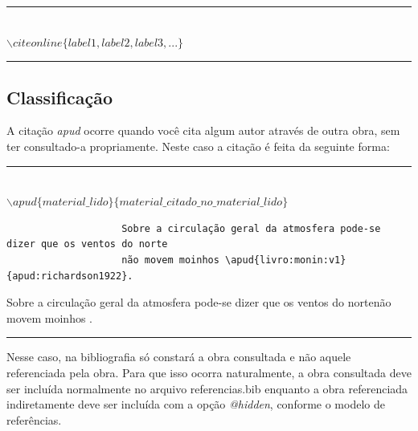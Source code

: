 \documentclass[oneside,openright,12pt]{ufsm_2015} %
\begin{document}
            \begin{center}\rule{0.5\textwidth}{1pt}\\$\backslash citeonline\{label1,label2,label3,...\}$\end{center}
            
            \begin{center}\rule{0.5\textwidth}{1pt}\end{center}   
            
            \subsection{Classificação}
                \par A citação \textit{apud} ocorre quando você cita algum autor através de outra obra, sem ter consultado-a propriamente. Neste caso a citação é feita da seguinte forma:
                \begin{center}
                  \rule{0.5\textwidth}{1pt}\\
                  $\backslash apud\{material\_lido\}\{material\_citado\_no\_material\_lido\}$ \\
                \end{center}
                \begin{verbatim}
                    Sobre a circulação geral da atmosfera pode-se dizer que os ventos do norte
                    não movem moinhos \apud{livro:monin:v1}{apud:richardson1922}.
                \end{verbatim}
      
                Sobre a circulação geral da atmosfera pode-se dizer que os ventos do nortenão movem moinhos
                .
        
                \begin{center}\rule{0.5\textwidth}{1pt}\end{center} 
                
                \par Nesse caso, na bibliografia só constará a obra consultada e não aquele referenciada pela obra. Para que isso ocorra naturalmente, a obra consultada deve ser incluída normalmente no arquivo referencias.bib enquanto a obra referenciada indiretamente deve ser incluída com a opção \textit{@hidden}, conforme o modelo de referências.
            
\end{document}
